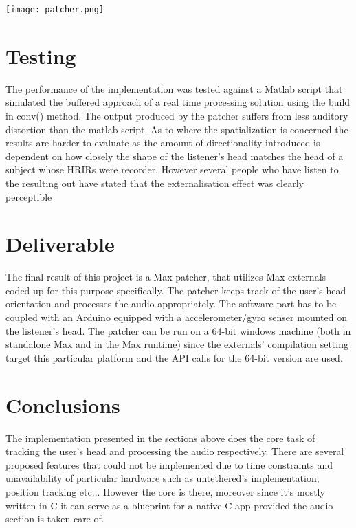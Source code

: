\documentclass[a4paper,12pt,oneside]{article}
\begin{document}
\begin{center}
\texttt{[image: patcher.png]}
\end{center}

\section{Testing}

The performance of the implementation was tested against a Matlab script that simulated the buffered approach of a real time processing solution using the build in conv() method. The output produced by the patcher suffers from less auditory distortion than the matlab script. As to where the spatialization is concerned the results are harder to evaluate as the amount of directionality introduced is dependent on how closely the shape of the listener's head matches the head of a subject whose HRIRs were recorder. However several people who have listen to the resulting out have stated that the externalisation effect was clearly perceptible

\section{Deliverable}

The final result of this project is a Max patcher, that utilizes Max externals coded up for this purpose specifically. The patcher keeps track of the user's head orientation and processes the audio appropriately. The software part has to be coupled with an Arduino equipped with a accelerometer/gyro senser mounted on the listener's head. The patcher can be run on a 64-bit windows machine (both in standalone Max and in the Max runtime) since the externals' compilation setting target this particular platform and the API calls for the 64-bit version are used.

\section{Conclusions}

The implementation presented in the sections above does the core task of tracking the user's head and processing the audio respectively. There are several proposed features that could not be implemented due to time constraints and unavailability of particular hardware such as untethered's implementation, position tracking etc... However the core is there, moreover since it's mostly written in C it can serve as a blueprint for a native C app provided the audio section is taken care of.  
  
\end{document}
